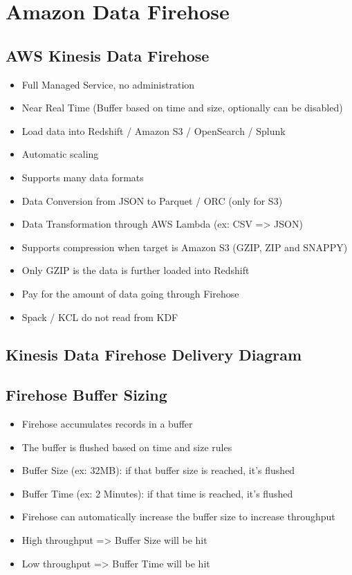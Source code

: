 \section{Amazon Data Firehose}

\subsection{AWS Kinesis Data Firehose}
\begin{itemize}
    \item Full Managed Service, no administration
    \item Near Real Time (Buffer based on time and size, optionally can be disabled)
    \item Load data into Redshift / Amazon S3 / OpenSearch / Splunk
    \item Automatic scaling
    \item Supports many data formats
    \item Data Conversion from JSON to Parquet / ORC (only for S3)
    \item Data Transformation through AWS Lambda (ex: CSV => JSON)
    \item Supports compression when target is Amazon S3 (GZIP, ZIP and SNAPPY)
    \item Only GZIP is the data is further loaded into Redshift
    \item Pay for the amount of data going through Firehose
    \item Spack / KCL do not read from KDF
\end{itemize}

\subsection{Kinesis Data Firehose Delivery Diagram}

\subsection{Firehose Buffer Sizing}
\begin{itemize}
    \item Firehose accumulates records in a buffer
    \item The buffer is flushed based on time and size rules
    \item Buffer Size (ex: 32MB): if that buffer size is reached, it's flushed
    \item Buffer Time (ex: 2 Minutes): if that time is reached, it's flushed
    \item Firehose can automatically increase the buffer size to increase throughput
    \item High throughput => Buffer Size will be hit
    \item Low throughput => Buffer Time will be hit
\end{itemize}


